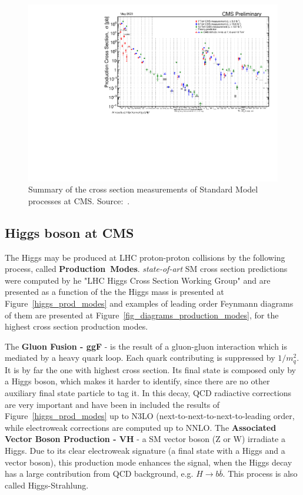 \begin{figure}
  \centering
  \includegraphics[width=\textwidth]{figures_and_tables/theory/cms_sm_xsec.pdf}
  \caption{ Summary of the cross section measurements of Standard Model processes at CMS. Source:~\cite{cms_sm_xsec_summary}.}
  \label{cms_sm_xsec}
\end{figure}



\clearpage 

\subsection{Higgs boson at CMS}
\label{section_sm_vb_results}

The Higgs may be produced at LHC proton-proton collisions by the following process, called \mbox{\textbf{Production Modes}}. \textit{state-of-art} SM cross section predictions were computed by he "LHC Higgs Cross Section Working Group"\cite{deFlorian:2016spz} and are presented as a function of the the Higgs mass is presented at Figure~\ref{higgs_prod_modes} and examples of leading order Feynmann diagrams of them are presented at Figure~\ref{fig_diagrams_production_modes}, for the highest cross section production modes.

The \textbf{Gluon Fusion - ggF} - is the result of a gluon-gluon interaction which is mediated by a heavy quark loop. Each quark contributing is suppressed by $1/m_{q}^{2}$. It is by far the one with highest cross section. Its final state is composed only by a Higgs boson, which makes it harder to identify, since there are no other auxiliary final state particle to tag it. In this decay, QCD radiactive corrections are very important and have been in included the results of Figure~\ref{higgs_prod_modes} up to N3LO (next-to-next-to-next-to-leading order, while electroweak corrections are computed up to NNLO. The \textbf{Associated Vector Boson Production - VH} - a SM vector boson (Z or W) irradiate a Higgs. Due to its clear electroweak signature (a final state with a Higgs and a vector boson), this production mode enhances the signal, when the Higgs decay has a large contribution from QCD background, e.g. $H \rightarrow b\bar{b}$. This process is also called Higgs-Strahlung.

